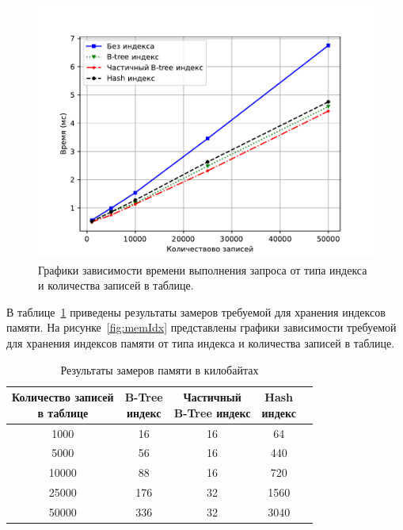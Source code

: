 \begin{figure}[h]
	\centering
	\includegraphics[width=1\textwidth, height=0.4\textheight]{research/time}
	\caption{Графики зависимости времени выполнения запроса от типа индекса и количества записей в таблице.}
	\label{fig:timeIdx}
\end{figure}
В таблице~\ref{tab:memIdx} приведены результаты замеров требуемой для хранения индексов памяти.
На рисунке~\ref{fig:memIdx} представлены графики зависимости требуемой для хранения индексов памяти от типа индекса и количества записей в таблице.

\begin{table}[H]
	\begin{center}
		\begin{center}
			\caption{\label{tab:memIdx}Результаты замеров памяти в килобайтах}
		\end{center}
		\begin{tabular}{|c|c|c|c|c|}
			\hline 
			\specialcell{Количество записей\\ в таблице} & \specialcell{B-Tree \\индекс} & \specialcell{Частичный \\B-Tree индекс} & \specialcell{Hash\\ индекс}  \\\hline
		1000   & 		16 & 16 & 		64  \\ \hline
		5000   & 		56 & 16 & 		440  \\ \hline
		10000  & 		88 & 16 & 		720  \\ \hline
		25000  & 		176 & 32 & 		1560  \\ \hline
		50000  & 		336 & 32 & 		3040  \\ \hline

		\end{tabular}
	\end{center}
\end{table}

